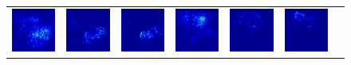 \begin{figure}
\begin{center}
\begin{tabular}{ccccccc}
\includegraphics[width=0.14\linewidth,height=0.115\linewidth]{figs/examples/alexnet/soft/zeb-ele2_sali_341} &
\includegraphics[width=0.14\linewidth,height=0.115\linewidth]{figs/examples/vggnet/soft/zeb-ele2_sali_341} &
\includegraphics[width=0.14\linewidth,height=0.115\linewidth]{figs/examples/googlenet/soft/zeb-ele2_sali_341} &
\includegraphics[width=0.14\linewidth,height=0.115\linewidth]{figs/examples/alexnet/soft/zeb-ele2_sali_387} &
\includegraphics[width=0.14\linewidth,height=0.115\linewidth]{figs/examples/vggnet/soft/zeb-ele2_sali_387} &
\includegraphics[width=0.14\linewidth,height=0.115\linewidth]{figs/examples/googlenet/soft/zeb-ele2_sali_387} \\

\end{tabular}
\end{center}
\end{figure}
